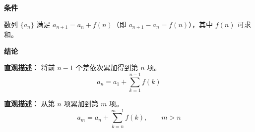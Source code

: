 \begin{statementbox}
	\textbf{\textcolor{CStatement}{条件}}
	\begin{description}[style=nextline, leftmargin=2.8em, labelsep=0.5em, itemsep=0.35em]
		\item[\textbf{\textcolor{CStatement}{条件1（递推形式）：}}] 数列 $\{a_n\}$ 满足 $a_{n+1}=a_n+f(n)$（即 $a_{n+1}-a_n=f(n)$），其中 $f(n)$ 可求和。
	\end{description}

	\textbf{\textcolor{CStatement}{结论}}
	\begin{description}[style=nextline, leftmargin=2.8em, labelsep=0.5em, itemsep=0.45em]
		\item[\textbf{\textcolor{CStatement}{结论一（通项公式）：}}]
			\textbf{\textcolor{CStatement}{直观描述：}}
			将前 $n-1$ 个差依次累加得到第 $n$ 项。
			\[
				a_n = a_1 + \sum_{k=1}^{n-1} f(k)
			\]

		\item[\textbf{\textcolor{CStatement}{推广结论（一般累加）：}}]
			\textbf{\textcolor{CStatement}{直观描述：}}
			从第 $n$ 项累加到第 $m$ 项。
			\[
				a_m = a_n + \sum_{k=n}^{m-1} f(k),
				\qquad
				m>n
			\]
	\end{description}
\end{statementbox}

